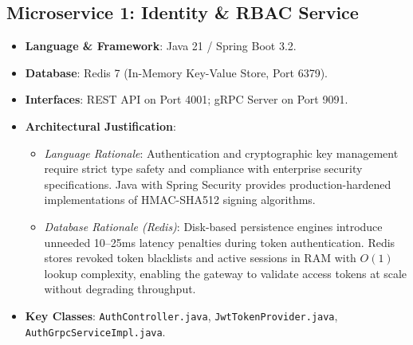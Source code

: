 \documentclass[11pt,a4paper]{article}
\begin{document}
\subsection{Microservice 1: Identity \& RBAC Service}
\begin{itemize}[leftmargin=1.5em]
    \item \textbf{Language \& Framework}: Java 21 / Spring Boot 3.2.
    \item \textbf{Database}: Redis 7 (In-Memory Key-Value Store, Port 6379).
    \item \textbf{Interfaces}: REST API on Port 4001; gRPC Server on Port 9091.
    \item \textbf{Architectural Justification}:
    \begin{itemize}
        \item \textit{Language Rationale}: Authentication and cryptographic key management require strict type safety and compliance with enterprise security specifications. Java with Spring Security provides production-hardened implementations of HMAC-SHA512 signing algorithms.
        \item \textit{Database Rationale (Redis)}: Disk-based persistence engines introduce unneeded 10--25ms latency penalties during token authentication. Redis stores revoked token blacklists and active sessions in RAM with $O(1)$ lookup complexity, enabling the gateway to validate access tokens at scale without degrading throughput.
    \end{itemize}
    \item \textbf{Key Classes}: \texttt{AuthController.java}, \texttt{JwtTokenProvider.java}, \texttt{AuthGrpcServiceImpl.java}.
\end{itemize}
\end{document}
